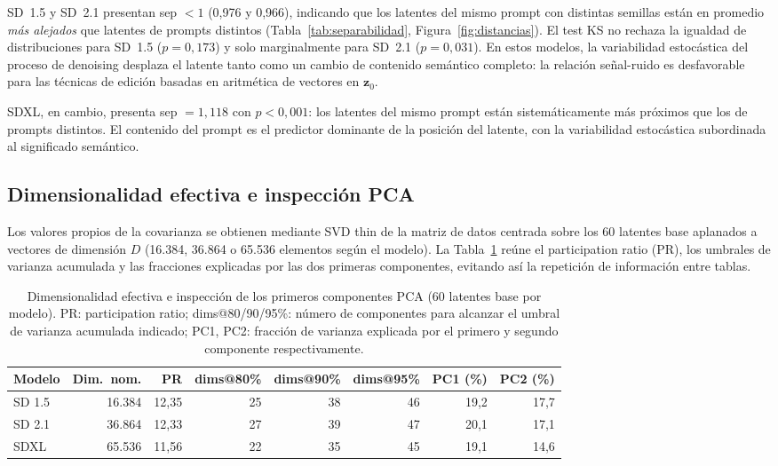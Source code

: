 \documentclass[12pt, a4paper, twoside]{book}
\newcommand{\z}{\mathbf{z}}
\begin{document}
SD~1.5 y SD~2.1 presentan sep $< 1$ (0,976 y 0,966), indicando que los latentes del mismo
prompt con distintas semillas están en promedio \emph{más alejados} que latentes de prompts
distintos (Tabla~\ref{tab:separabilidad}, Figura~\ref{fig:distancias}). El test KS no rechaza
la igualdad de distribuciones para SD~1.5 ($p = 0{,}173$) y solo marginalmente para SD~2.1
($p = 0{,}031$). En estos modelos, la variabilidad estocástica del proceso de denoising
desplaza el latente tanto como un cambio de contenido semántico completo: la relación
señal-ruido es desfavorable para las técnicas de edición basadas en aritmética de vectores
en $\z_0$.

SDXL, en cambio, presenta sep $= 1{,}118$ con $p < 0{,}001$: los latentes del mismo prompt
están sistemáticamente más próximos que los de prompts distintos. El contenido del prompt
es el predictor dominante de la posición del latente, con la variabilidad estocástica
subordinada al significado semántico.

\subsection{Dimensionalidad efectiva e inspección PCA}
\label{subsec:res:dimensionalidad}

Los valores propios de la covarianza se obtienen mediante SVD thin de la matriz de datos
centrada sobre los 60 latentes base aplanados a vectores de dimensión $D$ (16.384, 36.864
o 65.536 elementos según el modelo). La Tabla~\ref{tab:dimensionalidad} reúne el participation
ratio (PR), los umbrales de varianza acumulada y las fracciones explicadas por las dos primeras
componentes, evitando así la repetición de información entre tablas.

\begin{table}[htb]
\centering
\caption{Dimensionalidad efectiva e inspección de los primeros componentes PCA (60 latentes
base por modelo). PR: participation ratio; dims@80/90/95\%: número de componentes para
alcanzar el umbral de varianza acumulada indicado; PC1, PC2: fracción de varianza explicada
por el primero y segundo componente respectivamente.}
\label{tab:dimensionalidad}
\small
\begin{tabular}{lrrrrrrr}
\toprule
\textbf{Modelo} & \textbf{Dim.\ nom.} & \textbf{PR} & \textbf{dims@80\%} &
\textbf{dims@90\%} & \textbf{dims@95\%} & \textbf{PC1 (\%)} & \textbf{PC2 (\%)} \\
\midrule
SD 1.5 & 16.384 & 12,35 & 25 & 38 & 46 & 19,2 & 17,7 \\
SD 2.1 & 36.864 & 12,33 & 27 & 39 & 47 & 20,1 & 17,1 \\
SDXL   & 65.536 & 11,56 & 22 & 35 & 45 & 19,1 & 14,6 \\
\bottomrule
\end{tabular}
\end{table}
\end{document}
